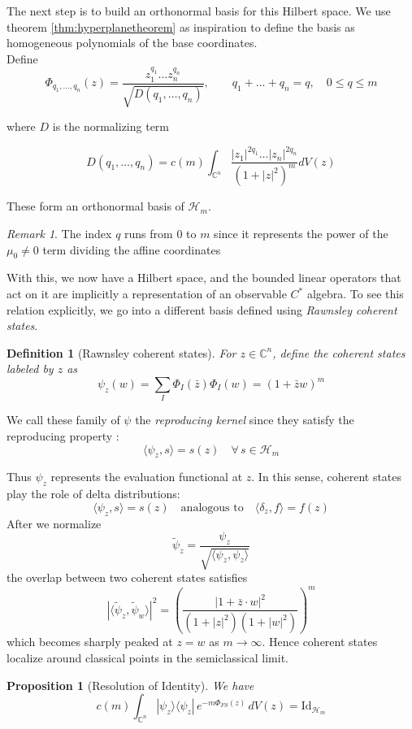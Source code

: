 \documentclass[
  12pt,
  a4paper, oneside
]{report}
\theoremstyle{bolddef}
\newtheorem{definition}{Definition}
\newtheorem{proposition}[theorem]{Proposition}
\theoremstyle{remark}
\newtheorem{remark}[theorem]{Remark}
\numberwithin{equation}{chapter}
\begin{document}
The next step is to build an orthonormal basis for this Hilbert space. We use theorem \ref{thm:hyperplanetheorem} as inspiration to define the basis as homogeneous polynomials of the base coordinates. \\ Define
$$
\Phi_{q_1,\dots,q_n}(z)
=
\frac{z_1^{q_1}\dots z_n^{q_n}}{\sqrt{D(q_1,\dots,q_n)}}, \qquad 
q_1+\dots+q_n = q,
\quad
0\le q\le m
$$

where $D$ is the normalizing term

$$
D(q_1,\dots,q_n)
=
c(m)
\int_{\mathbb C^n}
\frac{|z_1|^{2q_1}\dots|z_n|^{2q_n}}{(1+|z|^2)^m}
dV(z)
$$

These form an orthonormal basis of $\mathcal H_m$. 
\begin{remark}
The index $q$ runs from $0$ to $m$ since it represents the power of the $\mu_{0} \ne 0$ term dividing the affine coordinates
\end{remark}
With this, we now have a Hilbert space, and the bounded linear operators that act on it are implicitly a representation of an observable $C^{*}$ algebra. To see this relation explicitly, we go into a different basis defined using \textit{Rawnsley coherent states}.

\begin{definition}[Rawnsley coherent states]
For $z\in\mathbb C^n$, define the coherent states labeled by $z$ as
$$
\psi_z(w)
=
\sum_I \Phi_I(\bar{z})\Phi_I(w) = (1+ \bar{z}w)^{m} 
$$
\end{definition}


We call these family of $\psi$ the \textit{reproducing kernel} since they satisfy the reproducing property : 
$$
\langle \psi_z, s\rangle = s(z)  \quad \forall \, s \in \mathcal{H}_{m}
$$



Thus $\psi_z$ represents the evaluation functional at $z$.
In this sense, coherent states play the role of
delta distributions:
$$
\langle \psi_z , s \rangle = s(z)
\quad
\text{analogous to}
\quad
\langle \delta_z , f \rangle = f(z)
$$
After we normalize
$$
\widetilde{\psi}_z
=
\frac{\psi_z}{\sqrt{\langle \psi_z,\psi_z\rangle}}
$$
the overlap between two coherent states satisfies
$$
|\langle \widetilde{\psi}_z , \widetilde{\psi}_w \rangle|^2
=
\left(
\frac{|1+\bar z \cdot w|^2}
{(1+|z|^2)(1+|w|^2)}
\right)^m
$$
which becomes sharply peaked at $z=w$ as $m\to\infty$.
Hence coherent states localize around classical points in the semiclassical limit.

\begin{proposition}[Resolution of Identity]
We have
$$
c(m)
\int_{\mathbb C^n}
|\psi_z\rangle\langle\psi_z|
\, e^{-m\Phi_{FS}(z)}\, dV(z)
=
\mathrm{Id}_{\mathcal H_m}
$$
\end{proposition}
\end{document}
